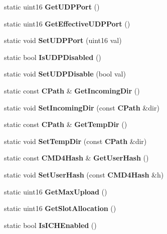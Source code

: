 \begin{DoxyCompactItemize}
\item 
static uint16 {\bfseries GetUDPPort} ()\label{classCPreferences_aff79ffdd5cea79a80d849c4b8515b7c3}

\item 
static uint16 {\bfseries GetEffectiveUDPPort} ()\label{classCPreferences_acbc5e8c8ed75edae49a446ad32495233}

\item 
static void {\bfseries SetUDPPort} (uint16 val)\label{classCPreferences_ae67ae1026d8d51f533d632bf442409cc}

\item 
static bool {\bfseries IsUDPDisabled} ()\label{classCPreferences_a9a0ca76c7303271cf068464ebcac833e}

\item 
static void {\bfseries SetUDPDisable} (bool val)\label{classCPreferences_adae948dc5137901471d963382c9cb403}

\item 
static const {\bf CPath} \& {\bfseries GetIncomingDir} ()\label{classCPreferences_a60df2f2d03ece03f4caf6ee6f61d7978}

\item 
static void {\bfseries SetIncomingDir} (const {\bf CPath} \&dir)\label{classCPreferences_a7c7fd4e0094d1f27056cbda67ad491cd}

\item 
static const {\bf CPath} \& {\bfseries GetTempDir} ()\label{classCPreferences_a774aa10723a5e9d4d81371d4a7032f26}

\item 
static void {\bfseries SetTempDir} (const {\bf CPath} \&dir)\label{classCPreferences_ad662b8c9712dbd72b982d6eebe12e2a5}

\item 
static const {\bf CMD4Hash} \& {\bfseries GetUserHash} ()\label{classCPreferences_aace546597447e73657246de83d7b9365}

\item 
static void {\bfseries SetUserHash} (const {\bf CMD4Hash} \&h)\label{classCPreferences_a1e185ac33ff547d891c55a148da93ac2}

\item 
static uint16 {\bfseries GetMaxUpload} ()\label{classCPreferences_a59225b244bdb63c61210bf0375d86302}

\item 
static uint16 {\bfseries GetSlotAllocation} ()\label{classCPreferences_a877a7ae716dcfa113e2397474e3e7975}

\item 
static bool {\bfseries IsICHEnabled} ()\label{classCPreferences_a9d007674671e33a25bb234645e768276}


\end{DoxyCompactItemize}
